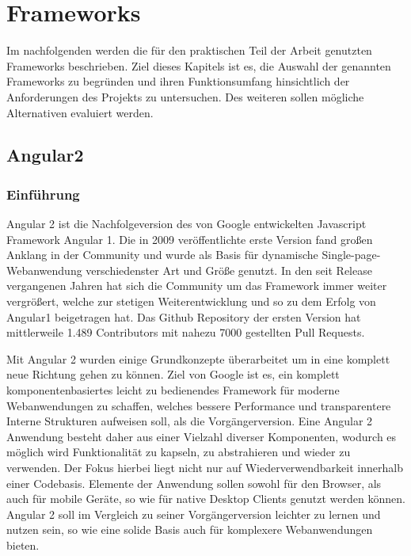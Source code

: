 
\chapter{Frameworks}

Im nachfolgenden werden die für den praktischen Teil der Arbeit genutzten Frameworks beschrieben.
Ziel dieses Kapitels ist es, die Auswahl der genannten Frameworks zu begründen und
ihren Funktionsumfang hinsichtlich der Anforderungen des Projekts zu untersuchen.
Des weiteren sollen mögliche Alternativen evaluiert werden.


\section{Angular2}
\subsection{Einführung}

Angular 2 ist die Nachfolgeversion des von Google entwickelten Javascript Framework Angular 1.
Die in 2009 veröffentlichte erste Version fand großen Anklang in der Community
und wurde als Basis für dynamische Single-page-Webanwendung verschiedenster Art und Größe genutzt.
In den seit Release vergangenen Jahren hat sich die Community um das Framework immer weiter vergrößert,
welche zur stetigen Weiterentwicklung und so zu dem Erfolg von Angular1 beigetragen hat.
Das Github Repository der ersten Version hat mittlerweile 1.489 Contributors mit nahezu 7000 gestellten Pull Requests. \cite{ng1-github}

Mit Angular 2 wurden einige Grundkonzepte überarbeitet um in eine komplett neue Richtung gehen zu können.
Ziel von Google ist es, ein komplett komponentenbasiertes leicht zu bedienendes Framework für moderne
Webanwendungen zu schaffen, welches bessere Performance und transparentere Interne Strukturen aufweisen soll, als die Vorgängerversion.
Eine Angular 2 Anwendung besteht daher aus einer Vielzahl diverser Komponenten, wodurch es möglich wird
Funktionalität zu kapseln, zu abstrahieren und wieder zu verwenden. Der Fokus hierbei liegt nicht nur auf Wiederverwendbarkeit innerhalb einer Codebasis.
Elemente der Anwendung sollen sowohl für den Browser, als auch für mobile Geräte, so wie für native Desktop Clients genutzt werden können.
Angular 2 soll im Vergleich zu seiner Vorgängerversion leichter zu lernen und nutzen sein,
so wie eine solide Basis auch für komplexere Webanwendungen bieten. \cite[11-12]{Angular2}

